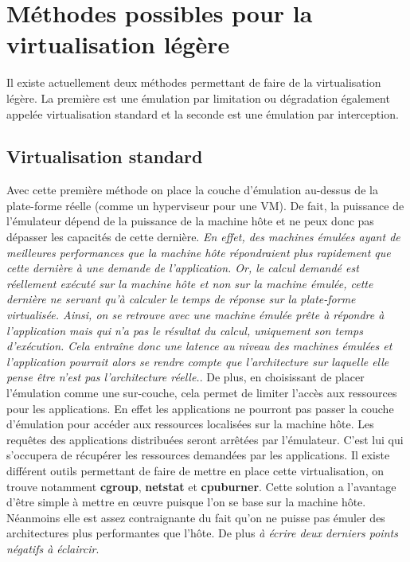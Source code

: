 \section{Méthodes possibles pour la virtualisation légère}
\label{section:emulation}

Il existe actuellement deux méthodes permettant de faire de la virtualisation
légère. La première est une émulation par limitation ou dégradation également
appelée virtualisation standard et la seconde est une émulation par
interception.

\subsection{Virtualisation standard}
Avec cette première méthode on place la couche d'émulation au-dessus de la
plate-forme réelle (comme un hyperviseur pour une VM). De fait, la puissance de
l'émulateur dépend de la puissance de la machine hôte et ne peux donc pas
dépasser les capacités de cette dernière. \textit{En effet, des machines émulées
  ayant de meilleures performances que la machine hôte répondraient plus
  rapidement que cette dernière à une demande de l'application. Or, le calcul
  demandé est réellement exécuté sur la machine hôte et non sur la machine
  émulée, cette dernière ne servant qu'à calculer le temps de réponse sur la
  plate-forme virtualisée. Ainsi, on se retrouve avec une machine émulée prête à
  répondre à l'application mais qui n'a pas le résultat du calcul, uniquement
  son temps d'exécution. Cela entraîne donc une latence au niveau des machines
  émulées et l'application pourrait alors se rendre compte que l'architecture
  sur laquelle elle pense être n'est pas l'architecture réelle.}. De plus, en
choisissant de placer l'émulation comme une sur-couche, cela permet de limiter
l'accès aux ressources pour les applications. En effet les applications ne
pourront pas passer la couche d'émulation pour accéder aux ressources localisées
sur la machine hôte. Les requêtes des applications distribuées seront arrêtées
par l'émulateur. C'est lui qui s'occupera de récupérer les ressources demandées
par les applications. Il existe différent outils permettant de faire de mettre
en place cette virtualisation, on trouve notamment \textbf{cgroup},
\textbf{netstat} et \textbf{cpuburner}.  Cette solution a l'avantage d'être
simple à mettre en \oe uvre puisque l'on se base sur la machine hôte. Néanmoins
elle est assez contraignante du fait qu'on ne puisse pas émuler des
architectures plus performantes que l'hôte. De plus {\color{red} \textit{à
    écrire deux derniers points négatifs à éclaircir}}.

